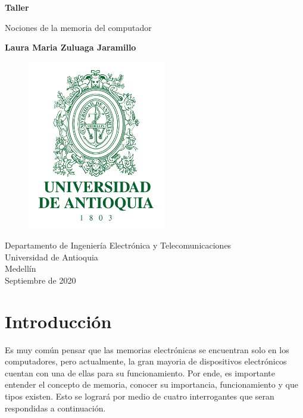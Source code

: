 \documentclass{article}
\begin{document}
\begin{titlepage}
    \begin{center}
        \vspace*{1cm}
            
        \Huge
        \textbf{Taller}
            
        \vspace{0.5cm}
        \LARGE
        Nociones de la memoria del computador
            
        \vspace{1.5cm}
            
        \textbf{Laura Maria Zuluaga Jaramillo}
        
        \vspace{0.8cm}
        
        \begin{figure}[h]
        \includegraphics[width=6cm]{udea.png}
        \centering
        \label{fig:udea}
        \end{figure}
            
        \vfill
            
        \vspace{0.8cm}
         
        \Large
        Departamento de Ingeniería Electrónica y Telecomunicaciones\\
        Universidad de Antioquia\\
        Medellín\\
        Septiembre de 2020
            
    \end{center}
\end{titlepage}

\tableofcontents

\section{Introducción}
Es muy común pensar que las memorias electrónicas se encuentran solo en los computadores, pero actualmente, la gran mayoria de dispositivos electrónicos cuentan con una de ellas para su funcionamiento. Por ende, es importante entender el concepto de memoria, conocer su importancia, funcionamiento y que tipos existen. Esto se logrará por medio de cuatro interrogantes que seran respondidas a continuación.
\end{document}
